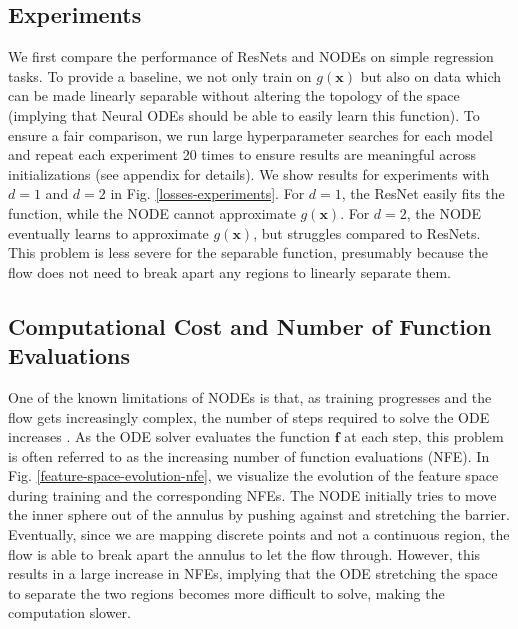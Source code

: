 \documentclass{article}
\begin{document}
\subsection{Experiments} 
We first compare the performance of ResNets and NODEs on simple regression tasks. To provide a baseline, we not only train on $g(\mathbf{x})$ but also on data which can be made linearly separable without altering the topology of the space (implying that Neural ODEs should be able to easily learn this function). To ensure a fair comparison, we run large hyperparameter searches for each model and repeat each experiment 20 times to ensure results are meaningful across initializations (see appendix for details). We show results for experiments with $d=1$ and $d=2$ in Fig. \ref{losses-experiments}. For $d=1$, the ResNet easily fits the function, while the NODE cannot approximate $g(\mathbf{x})$. For $d=2$, the NODE eventually learns to approximate $g(\mathbf{x})$, but struggles compared to ResNets. This problem is less severe for the separable function, presumably because the flow does not need to break apart any regions to linearly separate them.

\subsection{Computational Cost and Number of Function Evaluations}
One of the known limitations of NODEs is that, as training progresses and the flow gets increasingly complex, the number of steps required to solve the ODE increases \citep{chen2018neural, grathwohl2018ffjord}. As the ODE solver evaluates the function $\mathbf{f}$ at each step, this problem is often referred to as the increasing number of function evaluations (NFE). In Fig. \ref{feature-space-evolution-nfe}, we visualize the evolution of the feature space during training and the corresponding NFEs. The NODE initially tries to move the inner sphere out of the annulus by pushing against and stretching the barrier. Eventually, since we are mapping discrete points and not a continuous region, the flow is able to break apart the annulus to let the flow through. However, this results in a large increase in NFEs, implying that the ODE stretching the space to separate the two regions becomes more difficult to solve, making the computation slower.
\end{document}
